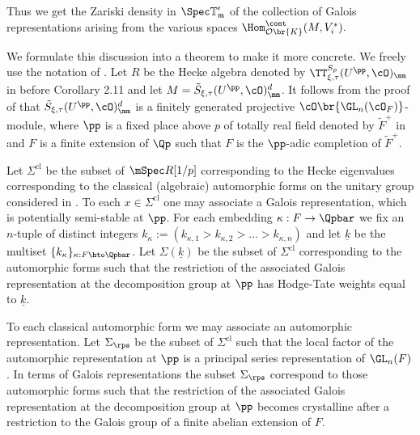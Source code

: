 Thus we get the Zariski density in $\Spec \mathbb T_{\mathfrak m}'$
of the collection of Galois representations arising from the various spaces
$\Hom_{\mathcal O\br{K}}^{\cont}(M,V_i^*).$

We formulate this discussion into a theorem to make it more concrete. We freely use the notation of \cite{six-authors}.
Let $R$ be the Hecke algebra denoted by
$\TT^{S_p}_{\xi, \tau}(U^{\pp}, \cO)_{\mm}$ in \cite{six-authors} before Corollary 2.11 and let $M= \tilde{S}_{\xi, \tau}(U^\pp, \cO)^d_\mm$.
It follows from the proof of \cite[Prop.\,2.10]{six-authors} that $\tilde{S}_{\xi, \tau}(U^\pp, \cO)^d_\mm$ is a finitely generated projective
$\cO\br{\GL_n(\cO_F)}$-module, where $\pp$ is a fixed place above $p$ of totally real field denoted by $\widetilde{F}^+$ in \cite{six-authors} and
$F$ is a finite extension of $\Qp$ such that $F$ is the $\pp$-adic completion of $\widetilde{F}^+$.

Let $\Sigma^{\mathrm{cl}}$ be the subset of $\mSpec R[1/p]$ corresponding to the Hecke eigenvalues corresponding
to the classical (algebraic) automorphic forms on the unitary group considered in \cite[\S 2.3]{six-authors}. To each $x\in \Sigma^{\mathrm{cl}}$
one may associate a Galois representation, which is potentially semi-stable at $\pp$. For each embedding $\kappa: F\to \Qpbar$ we fix
an $n$-tuple of distinct integers $k_{\kappa}:=(k_{\kappa, 1}> k_{\kappa, 2} > \ldots > k_{\kappa, n})$ and let $\underline{k}$ be the multiset
$\{k_\kappa\}_{\kappa: F \hto \Qpbar}$. Let $\Sigma(\underline{k})$ be the subset of $\Sigma^{\mathrm{cl}}$
corresponding to the automorphic forms such that the restriction of the associated Galois representation at the decomposition group at $\pp$
has Hodge-Tate weights equal to $\underline{k}$.

To each classical automorphic form we may associate an automorphic representation. Let $\Sigma_{\rps}$ be the subset of $\Sigma^{\mathrm{cl}}$ such that
the local factor of the automorphic representation at $\pp$ is a principal series representation of $\GL_n(F)$. In terms of Galois representations
the subset $\Sigma_{\rps}$ correspond to those automorphic forms such that the restriction of the associated Galois representation at the decomposition group at $\pp$ becomes crystalline after a restriction to the Galois group of a finite abelian extension of $F$.

